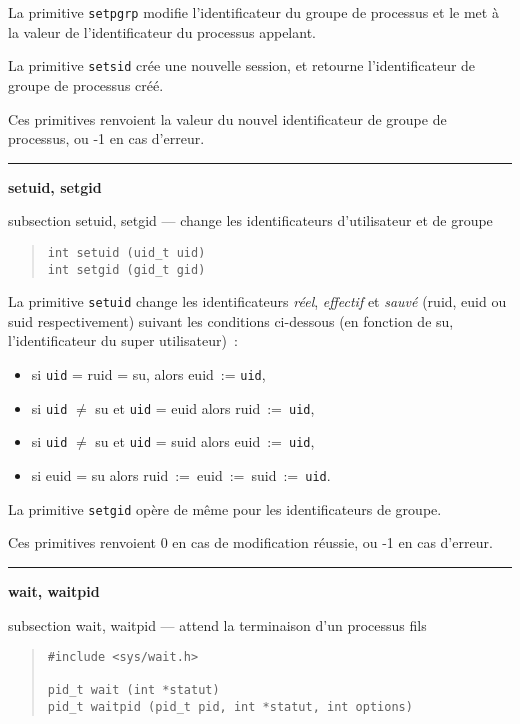 \documentclass [twoside] {report}
\newcommand {\primitive} [1]
    {
	\phantomsection
	{\large \bf #1}
	\addcontentsline {toc} {subsection} {#1}
    }
\newcommand {\separation}
    {
	\vspace {5mm}
	\nopagebreak
	\hrule
    }
\begin{document}
La primitive {\tt setpgrp} modifie l'identificateur du groupe
de processus et le met à la valeur de l'identificateur du
processus appelant.

La primitive {\tt setsid} crée une nouvelle session, et retourne
l'identificateur de groupe de processus créé.

Ces primitives renvoient la valeur du nouvel identificateur
de groupe de processus, ou -1 en cas d'erreur.




\separation
\primitive {setuid, setgid} --- change les identificateurs d'utilisateur et de groupe

\begin {quote}
\begin {verbatim}
int setuid (uid_t uid)
int setgid (gid_t gid)
\end{verbatim}
\end {quote}

La primitive {\tt setuid} change les identificateurs
{\it réel}, {\it effectif} et {\it sauvé} (ruid, euid ou
suid respectivement) suivant les conditions
ci-dessous (en fonction de su, l'identificateur du
super utilisateur)~:

\begin {itemize}
\item si {\tt uid} = ruid = su, alors euid~:= {\tt uid},
\item si {\tt uid} {$\neq$} su et {\tt uid} = euid alors ruid~:=~{\tt uid},
\item si {\tt uid} {$\neq$} su et {\tt uid} = suid alors euid~:=~{\tt uid},
\item si euid = su alors ruid~:=~euid~:=~suid~:=~{\tt uid}.
\end {itemize}

La primitive {\tt setgid} opère de même pour les
identificateurs de groupe.

Ces primitives renvoient 0 en cas de modification
réussie, ou -1 en cas d'erreur.




\separation
\primitive {wait, waitpid} --- attend la terminaison d'un processus fils

\begin {quote}
\begin {verbatim}
#include <sys/wait.h>

pid_t wait (int *statut)
pid_t waitpid (pid_t pid, int *statut, int options)
\end{verbatim}
\end {quote}
\end{document}
